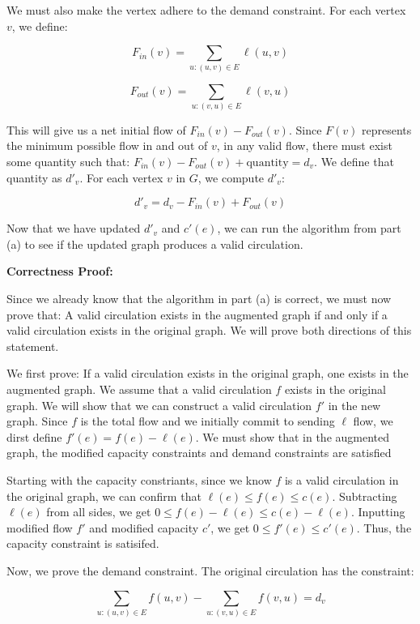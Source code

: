 \documentclass[11pt]{article}
\begin{document}
\begin{enumerate}
We must also make the vertex adhere to the demand constraint. For each vertex $v$, we define:

$$F_{in}(v) = \sum_{u: (u, v) \in E} \ell(u, v)$$

$$F_{out}(v) = \sum_{u: (v, u) \in E} \ell(v, u)$$

This will give us a net initial flow of $F_{in}(v) - F_{out}(v)$. Since $F(v)$ represents the minimum possible flow in and out of $v$, in any valid flow,
there must exist some quantity such that: $F_{in}(v) - F_{out}(v) + \text{quantity} = d_v$. 
We define that quantity as $d'_v$. For each vertex $v$ in $G$, we compute $d'_v$: 

$$d'_v = d_v - F_{in}(v) + F_{out}(v)$$

Now that we have updated $d'_v$ and $c'(e)$, we can run the algorithm from part (a) to see if the updated graph produces a valid circulation.

\bigbreak

\textbf{Correctness Proof:}

Since we already know that the algorithm in part (a) is correct, we must now prove that: 
A valid circulation exists in the augmented graph if and only if a valid circulation exists in the original graph. 
We will prove both directions of this statement.

\medbreak

We first prove: If a valid circulation exists in the original graph, one exists in the augmented graph. 
We assume that a valid circulation $f$ exists in the original graph. We will show that we can construct a valid circulation $f'$ in the new graph. 
Since $f$ is the total flow and we initially commit to sending $\ell$ flow, we dirst define $f'(e) = f(e) - \ell(e)$. 
We must show that in the augmented graph, the modified capacity constraints and demand constraints are satisfied

Starting with the capacity constriants, since we know $f$ is a valid circulation in the original graph, we can confirm that 
$\ell(e) \leq f(e) \leq c(e)$. Subtracting $\ell(e)$ from all sides, we get $0 \leq f(e) - \ell(e) \leq c(e) - \ell(e)$. 
Inputting modified flow $f'$ and modified capacity $c'$, we get $0 \leq f'(e) \leq c'(e)$. 
Thus, the capacity constraint is satisifed.

Now, we prove the demand constraint. The original circulation has the constraint:

$$\sum_{u: (u, v) \in E} f(u, v) - \sum_{u: (v, u) \in E} f(v, u) = d_v$$


\end{enumerate}
\end{document}
